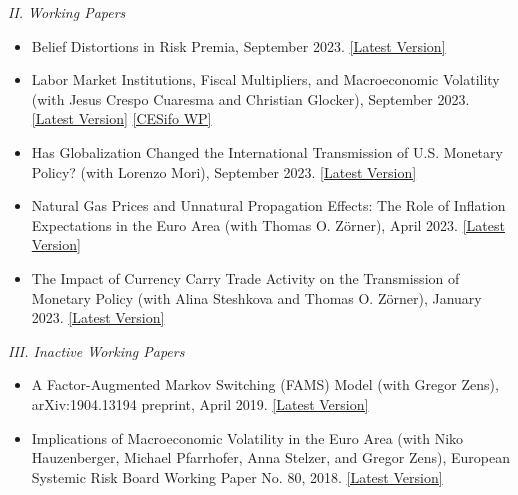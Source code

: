\documentclass{resume} %
\begin{document}
\clearpage
{\large \itshape II. Working Papers}
\vspace{0.1cm}
\begin{itemize}
    \par \begingroup \leftskip1em \rightskip2em \vspace*{-0.2cm}
    \item Belief Distortions in Risk Premia, September 2023. \href{https://mboeck11.github.io/papers/B2023WP.pdf}{[Latest Version]}
    \item Labor Market Institutions, Fiscal Multipliers, and Macroeconomic Volatility (with Jesus Crespo Cuaresma and Christian Glocker), September 2023. \href{https://mboeck11.github.io/papers/BCCG2023WP.pdf}{[Latest Version]} \href{https://www.cesifo.org/DocDL/cesifo1_wp9749.pdf}{[CESifo WP]}
    \item Has Globalization Changed the International Transmission of U.S. Monetary Policy? (with Lorenzo Mori), September 2023. \href{https://mboeck11.github.io/papers/BM2023WP.pdf}{[Latest Version]}
    \item Natural Gas Prices and Unnatural Propagation Effects: The Role of Inflation Expectations in the Euro Area (with Thomas O. Z\"{o}rner), April 2023. \href{https://mboeck11.github.io/papers/BZ2023WP.pdf}{[Latest Version]}
    \item The Impact of Currency Carry Trade Activity on the Transmission of Monetary Policy (with Alina Steshkova and Thomas O. Z\"{o}rner), January 2023. \href{https://mboeck11.github.io/papers/BSZ2023WP.pdf}{[Latest Version]}
    \par \endgroup
\end{itemize}

{\large \itshape III. Inactive Working Papers}
\vspace{0.1cm}
\begin{itemize}
    \par \begingroup \leftskip1em \rightskip2em \vspace*{-0.2cm}
    \item A Factor-Augmented Markov Switching (FAMS) Model (with Gregor Zens), arXiv:1904.13194 preprint, April 2019. \href{https://mboeck11.github.io/papers/ZB2019WP.pdf}{[Latest Version]}
    \item Implications of Macroeconomic Volatility in the Euro Area (with Niko Hauzenberger, Michael Pfarrhofer, Anna Stelzer, and Gregor Zens), European Systemic Risk Board Working Paper No. 80, 2018. \href{https://mboeck11.github.io/papers/HBPSZ2018WP.pdf}{[Latest Version]}
    \par \endgroup
\end{itemize}
\end{document}
